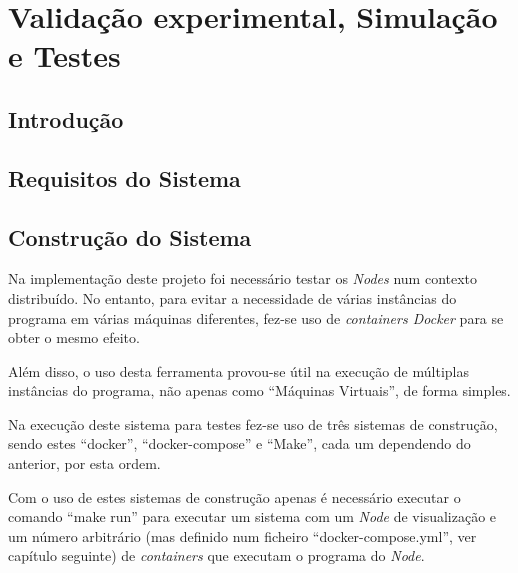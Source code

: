 \chapter{Validação experimental, Simulação e Testes}

\section{Introdução}
\label{chap5:sec:intro}

\section{Requisitos do Sistema}

\section{Construção do Sistema}

Na implementação deste projeto foi necessário testar os \emph{Nodes} num contexto distribuído.
No entanto, para evitar a necessidade de várias instâncias do programa em várias máquinas diferentes, fez-se uso de \emph{containers Docker} para se obter o mesmo efeito.

Além disso, o uso desta ferramenta provou-se útil na execução de múltiplas instâncias do programa, não apenas como ``Máquinas Virtuais'', de forma simples.

Na execução deste sistema para testes fez-se uso de três sistemas de construção, sendo estes ``docker'', ``docker-compose'' e ``Make'', cada um dependendo do anterior, por esta ordem.

Com o uso de estes sistemas de construção apenas é necessário executar o comando ``make run'' para executar um sistema com um \emph{Node} de visualização e um número arbitrário (mas definido num ficheiro ``docker-compose.yml'', ver capítulo seguinte) de \emph{containers} que executam o programa do \emph{Node}.


